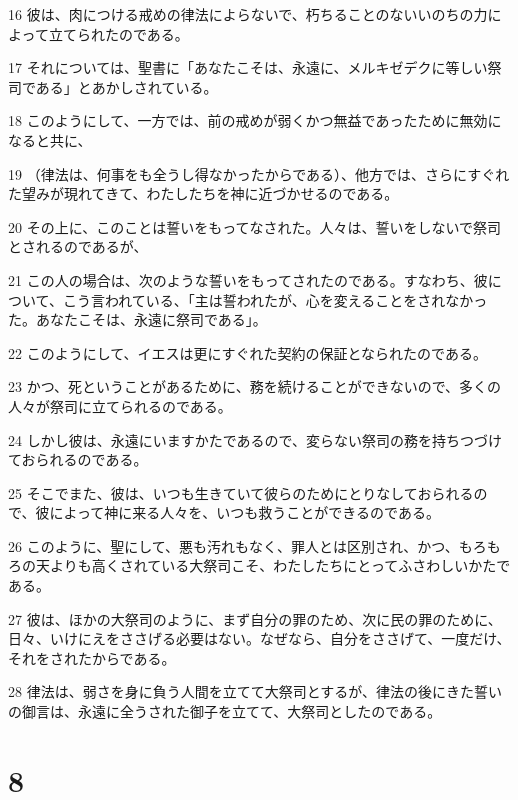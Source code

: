 \par 16 彼は、肉につける戒めの律法によらないで、朽ちることのないいのちの力によって立てられたのである。
\par 17 それについては、聖書に「あなたこそは、永遠に、メルキゼデクに等しい祭司である」とあかしされている。
\par 18 このようにして、一方では、前の戒めが弱くかつ無益であったために無効になると共に、
\par 19 （律法は、何事をも全うし得なかったからである）、他方では、さらにすぐれた望みが現れてきて、わたしたちを神に近づかせるのである。
\par 20 その上に、このことは誓いをもってなされた。人々は、誓いをしないで祭司とされるのであるが、
\par 21 この人の場合は、次のような誓いをもってされたのである。すなわち、彼について、こう言われている、「主は誓われたが、心を変えることをされなかった。あなたこそは、永遠に祭司である」。
\par 22 このようにして、イエスは更にすぐれた契約の保証となられたのである。
\par 23 かつ、死ということがあるために、務を続けることができないので、多くの人々が祭司に立てられるのである。
\par 24 しかし彼は、永遠にいますかたであるので、変らない祭司の務を持ちつづけておられるのである。
\par 25 そこでまた、彼は、いつも生きていて彼らのためにとりなしておられるので、彼によって神に来る人々を、いつも救うことができるのである。
\par 26 このように、聖にして、悪も汚れもなく、罪人とは区別され、かつ、もろもろの天よりも高くされている大祭司こそ、わたしたちにとってふさわしいかたである。
\par 27 彼は、ほかの大祭司のように、まず自分の罪のため、次に民の罪のために、日々、いけにえをささげる必要はない。なぜなら、自分をささげて、一度だけ、それをされたからである。
\par 28 律法は、弱さを身に負う人間を立てて大祭司とするが、律法の後にきた誓いの御言は、永遠に全うされた御子を立てて、大祭司としたのである。

\chapter{8}

